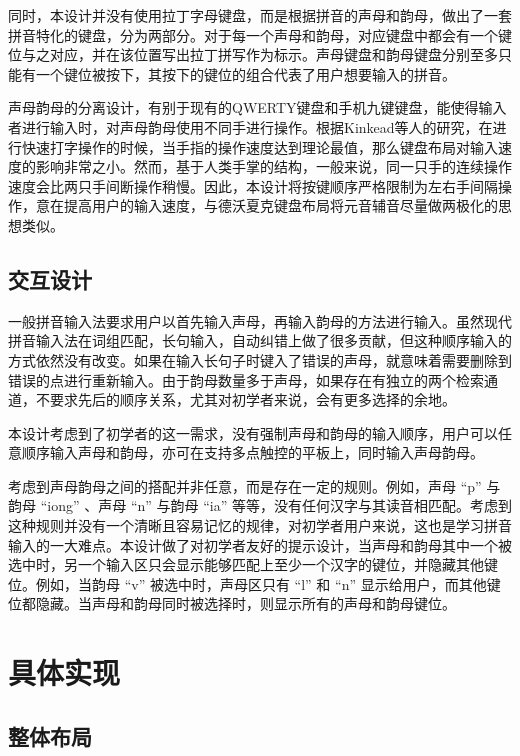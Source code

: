  同时，本设计并没有使用拉丁字母键盘，而是根据拼音的声母和韵母，做出了一套拼音特化的键盘，分为两部分。对于每一个声母和韵母，对应键盘中都会有一个键位与之对应，并在该位置写出拉丁拼写作为标示。声母键盘和韵母键盘分别至多只能有一个键位被按下，其按下的键位的组合代表了用户想要输入的拼音。

  声母韵母的分离设计，有别于现有的QWERTY键盘和手机九键键盘，能使得输入者进行输入时，对声母韵母使用不同手进行操作。根据Kinkead等人的研究\supercite{kinkead}，在进行快速打字操作的时候，当手指的操作速度达到理论最值，那么键盘布局对输入速度的影响非常之小。然而，基于人类手掌的结构，一般来说，同一只手的连续操作速度会比两只手间断操作稍慢\supercite{moscovich2008indirect}。因此，本设计将按键顺序严格限制为左右手间隔操作，意在提高用户的输入速度，与德沃夏克键盘布局将元音辅音尽量做两极化的思想类似。

  \subsection{交互设计}

  一般拼音输入法要求用户以首先输入声母，再输入韵母的方法进行输入。虽然现代拼音输入法在词组匹配，长句输入，自动纠错上做了很多贡献，但这种顺序输入的方式依然没有改变。如果在输入长句子时键入了错误的声母，就意味着需要删除到错误的点进行重新输入。由于韵母数量多于声母，如果存在有独立的两个检索通道，不要求先后的顺序关系，尤其对初学者来说，会有更多选择的余地。

  本设计考虑到了初学者的这一需求，没有强制声母和韵母的输入顺序，用户可以任意顺序输入声母和韵母，亦可在支持多点触控的平板上，同时输入声母韵母。

  考虑到声母韵母之间的搭配并非任意，而是存在一定的规则。例如，声母 “p” 与韵母 “iong” 、声母 “n” 与韵母 “ia” 等等，没有任何汉字与其读音相匹配。考虑到这种规则并没有一个清晰且容易记忆的规律，对初学者用户来说，这也是学习拼音输入的一大难点。本设计做了对初学者友好的提示设计，当声母和韵母其中一个被选中时，另一个输入区只会显示能够匹配上至少一个汉字的键位，并隐藏其他键位。例如，当韵母 “v” 被选中时，声母区只有 “l” 和 “n” 显示给用户，而其他键位都隐藏。当声母和韵母同时被选择时，则显示所有的声母和韵母键位。

  \section{具体实现}
  \subsection{整体布局}

